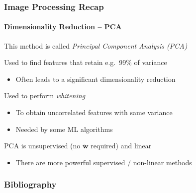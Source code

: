 \documentclass[xetex,professionalfont]{beamer}
\renewcommand{\vec}[1]{\ensuremath{\mathbf{#1}}}
\newcommand{\vw}{\vec{w}}
\begin{document}

\begin{frame}
\frametitle{Image Processing Recap}
\framesubtitle{Dimensionality Reduction -- PCA}

This method is called \emph{Principal Component Analysis (PCA)}

\bigskip
Used to find features that retain e.g.\ 99\% of variance
\begin{itemize}
    \item Often leads to a significant dimensionality reduction
\end{itemize}

\bigskip
Used to perform \emph{whitening} %
\begin{itemize}
    \item To obtain uncorrelated features with same variance %
    \item Needed by some ML algorithms
\end{itemize}

\bigskip
PCA is unsupervised (no $\dot{\vw}$ required) and linear
\begin{itemize}
    \item There are more powerful supervised / non-linear methods
\end{itemize}

\end{frame}


\begin{frame}[allowframebreaks=0.9]
\frametitle{Bibliography}

\printbibliography

\end{frame}
\end{document}
